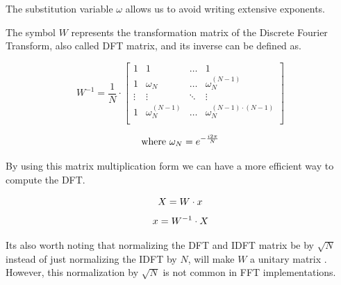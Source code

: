 \documentclass[
  oneside,
  11pt, a4paper,
  footinclude=true,
  headinclude=true,
  cleardoublepage=empty
]{scrbook}
\newcommand{\eqname}[1]{\tag*{#1}}%
\begin{document}
The substitution variable \(\omega\) allows us to avoid writing extensive exponents.

The symbol \(W\) represents the transformation matrix of the Discrete Fourier Transform, also called DFT matrix, and its inverse can be defined as.

\begin{equation*}
    W^{-1} = \frac{1}{N} \cdot
    \begin{bmatrix}
        1      & 1                  & \dots  & 1                              \\
        1      & \omega_{N}         & \dots  & \omega_{N}^{(N-1)}             \\
        \vdots & \vdots             & \ddots & \vdots                         \\
        1      & \omega_{N}^{(N-1)} & \dots  & \omega_{N}^{(N-1) \cdot (N-1)} \\
    \end{bmatrix}
\end{equation*}

\begin{equation*}
    \text{where } \omega_{N} = e^{- \frac{i 2 \pi}{N}} \\
\end{equation*}

By using this matrix multiplication form we can have a more efficient way to compute the DFT.  

\begin{equation*}
    X = W \cdot x \\ %
\end{equation*}
\begin{equation*}
    x = W^{-1} \cdot X \\ %
\end{equation*}

Its also worth noting that normalizing the DFT and IDFT matrix be by  \( \sqrt{N} \) instead of just normalizing the IDFT by \(N\), will make \(W\) a unitary matrix \cite{horn2012matrix}. However, this normalization by \( \sqrt{N} \) is not common in FFT implementations.

\end{document}
